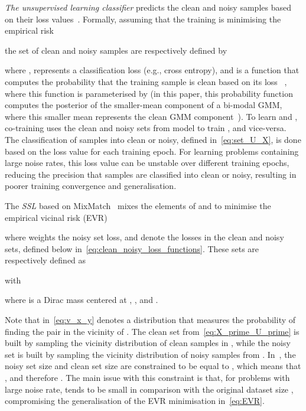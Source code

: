 \documentclass[review]{elsarticle}
\begin{document}
\textit{The unsupervised learning classifier} predicts the clean and noisy samples based on their loss values~\cite{arazo2019unsupervised, li2020dividemix,rog, jiang2020beyond}. 
Formally, assuming that the training is minimising the empirical risk 

the set of clean and noisy samples are respectively defined by 

where ,
 represents a classification loss (e.g., cross entropy),
and 
 is a function that computes the probability that the training sample  is clean based on its loss ~\cite{jiang2020beyond, li2020dividemix, zhang2020distilling,nguyen2019self}, where this function is parameterised by  (in this paper, this probability function computes the posterior of the smaller-mean component of a bi-modal GMM, where this smaller mean represents the clean GMM component~\cite{li2020dividemix}). To learn  and , co-training uses the clean and noisy sets from model  to train , and vice-versa. The classification of samples into clean or noisy, defined in~\eqref{eq:set_U_X}, is done based on the loss value for each training epoch. 
 For learning problems containing large noise rates, this loss value can be unstable over different training epochs, reducing the precision that samples are classified into clean or noisy, resulting in poorer training convergence and generalisation.


The \textit{SSL} based on MixMatch~\cite{berthelot2019mixmatch} mixes the elements of  and  to minimise the empirical vicinal risk (EVR)~\cite{zhang2017mixup}

where  weights the noisy set loss,  and  denote the losses in the clean and noisy sets, defined below in~\eqref{eq:clean_noisy_loss_functions}.  These sets are respectively defined as

with

where  is a Dirac mass centered at , , and .

Note that  in~\eqref{eq:v_x_y} denotes a distribution that measures the probability of finding the pair  in the vicinity of .
The clean set  from~\eqref{eq:X_prime_U_prime} is built by sampling the vicinity distribution of clean samples in , while the noisy set  is built by sampling the vicinity distribution of noisy samples from .
In~\cite{li2020dividemix},  the noisy set size  and clean set size  are constrained to be equal to 
, which means that   , and therefore .
The main issue with this constraint is that, for problems with large noise rate,  tends to be small in comparison with the original dataset size , compromising the generalisation of the EVR minimisation in~\eqref{eq:EVR}.
\end{document}

